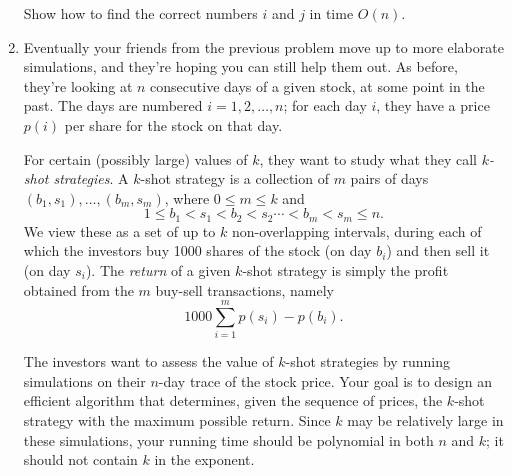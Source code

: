 \documentclass[12pt]{article}
\begin{document}
\begin{enumerate}
Show how to find the correct numbers $i$ and $j$ in time $O(n)$.




\item

Eventually your friends from the previous problem move up to 
more elaborate simulations, and they're hoping you can still help
them out.
As before, they're looking
at $n$ consecutive days of a given stock,
at some point in the past.
The days are numbered $i = 1, 2, \ldots, n$;
for each day $i$, they have a price $p(i)$ per
share for the stock on that day.

For certain (possibly large) values of $k$, they want to
study what they call {\em $k$-shot strategies}.
A $k$-shot strategy is a collection of $m$
pairs of days $(b_1, s_1), \ldots, (b_m, s_m)$,
where $0 \leq m \leq k$ and
$$1 \leq b_1 < s_1 < b_2 < s_2 \cdots < b_m < s_m \leq n.$$
We view these as a set of up to $k$ non-overlapping intervals,
during each of which the investors buy 1000 shares of the stock
(on day $b_i$) and then sell it (on day $s_i$).
The {\em return} of a given $k$-shot strategy
is simply the profit obtained from the $m$ buy-sell transactions,
namely
$$1000 \sum_{i=1}^m p(s_i) - p(b_i).$$

The investors want to assess the value of $k$-shot strategies
by running simulations on their $n$-day trace of the stock price.
Your goal is to design an efficient algorithm that
determines, given the sequence of prices,
the $k$-shot strategy with the maximum possible return.
Since $k$ may be relatively large in these simulations,
your running time should be polynomial in both $n$ and $k$;
it should not contain $k$ in the exponent.

\end{enumerate}
\end{document}
